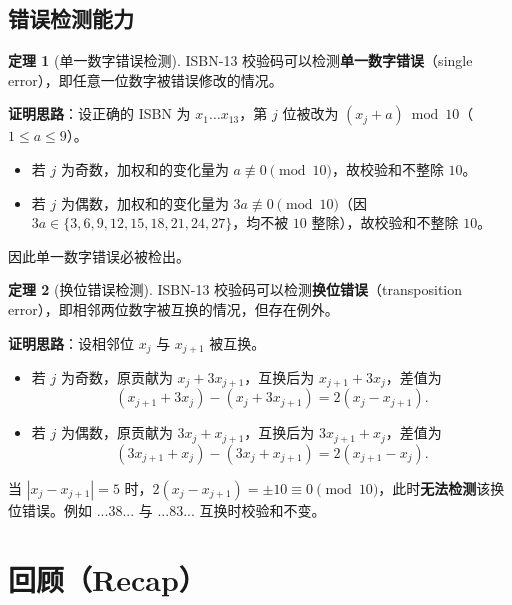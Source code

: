 \documentclass[UTF8,11pt,a4paper]{ctexbook}   %
\theoremstyle{definition}
\newtheorem{theorem}{定理}[section]
\begin{document}
\subsection{错误检测能力}

\begin{theorem}[单一数字错误检测]
ISBN-13 校验码可以检测\textbf{单一数字错误}（single error），即任意一位数字被错误修改的情况。

\textbf{证明思路}：设正确的 ISBN 为 $x_1\ldots x_{13}$，第 $j$ 位被改为 $(x_j + a) \bmod 10$（$1 \le a \le 9$）。
\begin{itemize}
    \item 若 $j$ 为奇数，加权和的变化量为 $a \not\equiv 0 \pmod{10}$，故校验和不整除 $10$。
    \item 若 $j$ 为偶数，加权和的变化量为 $3a \not\equiv 0 \pmod{10}$（因 $3a \in \{3,6,9,12,15,18,21,24,27\}$，均不被 $10$ 整除），故校验和不整除 $10$。
\end{itemize}
因此单一数字错误必被检出。
\end{theorem}

\begin{theorem}[换位错误检测]
ISBN-13 校验码可以检测\textbf{换位错误}（transposition error），即相邻两位数字被互换的情况，但存在例外。

\textbf{证明思路}：设相邻位 $x_j$ 与 $x_{j+1}$ 被互换。
\begin{itemize}
    \item 若 $j$ 为奇数，原贡献为 $x_j + 3x_{j+1}$，互换后为 $x_{j+1} + 3x_j$，差值为
    \[
    (x_{j+1} + 3x_j) - (x_j + 3x_{j+1}) = 2(x_j - x_{j+1}).
    \]
    \item 若 $j$ 为偶数，原贡献为 $3x_j + x_{j+1}$，互换后为 $3x_{j+1} + x_j$，差值为
    \[
    (3x_{j+1} + x_j) - (3x_j + x_{j+1}) = 2(x_{j+1} - x_j).
    \]
\end{itemize}
当 $|x_j - x_{j+1}| = 5$ 时，$2(x_j - x_{j+1}) = \pm 10 \equiv 0 \pmod{10}$，此时\textbf{无法检测}该换位错误。例如 $...38...$ 与 $...83...$ 互换时校验和不变。
\end{theorem}

\section{回顾（Recap）}
\end{document}
